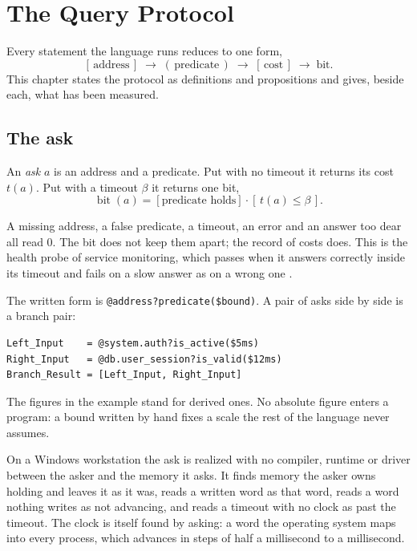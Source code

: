 \chapter{The Query Protocol}
\label{ch:protocol}

Every statement the language runs reduces to one form,
\[
  [\,\text{address}\,] \;\to\; (\,\text{predicate}\,) \;\to\; [\,\text{cost}\,] \;\to\; \text{bit}.
\]
This chapter states the protocol as definitions and propositions and gives, beside each, what has
been measured.

\section{The ask}

\begin{definition}[Ask]
An \emph{ask} \(a\) is an address and a predicate. Put with no timeout it returns its cost
\(t(a)\). Put with a timeout \(\beta\) it returns one bit,
\[
  \operatorname{bit}(a) = [\text{predicate holds}] \cdot [\,t(a) \le \beta\,].
\]
\end{definition}

A missing address, a false predicate, a timeout, an error and an answer too dear all read 0. The
bit does not keep them apart; the record of costs does. This is the health probe of service
monitoring, which passes when it answers correctly inside its timeout and fails on a slow answer
as on a wrong one \cite{src:Kubernetes-probes}.

The written form is \texttt{@address?predicate(\$bound)}. A pair of asks side by side is a branch
pair:
\begin{verbatim}
Left_Input    = @system.auth?is_active($5ms)
Right_Input   = @db.user_session?is_valid($12ms)
Branch_Result = [Left_Input, Right_Input]
\end{verbatim}
The figures in the example stand for derived ones. No absolute figure enters a program: a bound
written by hand fixes a scale the rest of the language never assumes.

On a Windows workstation the ask is realized with no compiler, runtime or driver between the
asker and the memory it asks. It finds memory the asker owns holding and leaves it as it was,
reads a written word as that word, reads a word nothing writes as not advancing, and reads a
timeout with no clock as past the timeout. The clock is itself found by asking: a word the
operating system maps into every process, which advances in steps of half a millisecond to a
millisecond.

